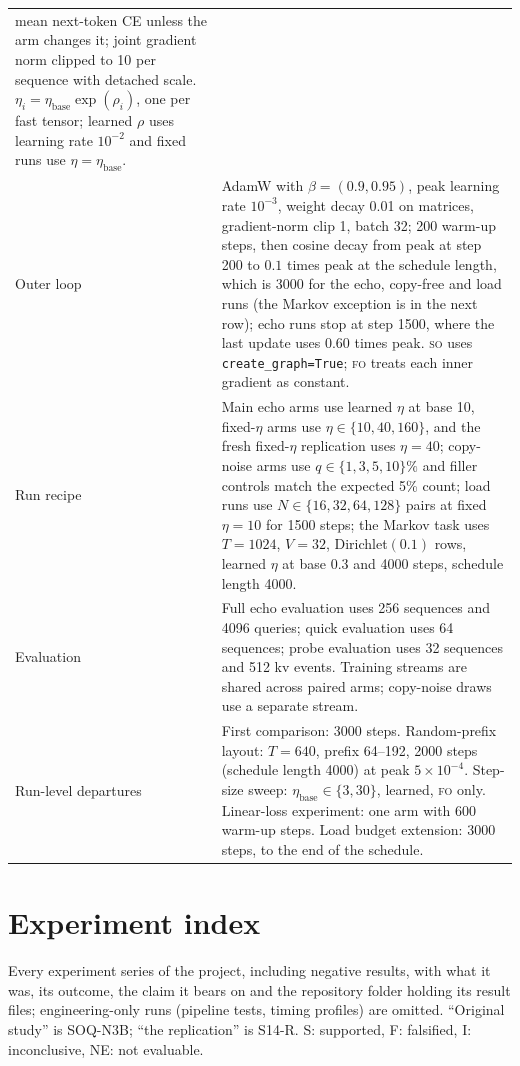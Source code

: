 \documentclass[11pt]{article}
\newcommand{\FO}{\textsc{fo}}
\newcommand{\SO}{\textsc{so}}
\begin{document}
\begin{table}[!htbp]
\begin{tabular}{@{}L{2.7cm}L{10.7cm}@{}}
mean next-token CE unless the arm changes it; joint gradient norm clipped to 10 per sequence with
detached scale. $\eta_i=\eta_{\text{base}}\exp(\rho_i)$, one per fast tensor; learned $\rho$ uses
learning rate $10^{-2}$ and fixed runs use $\eta=\eta_{\text{base}}$. \\
Outer loop & AdamW with $\beta=(0.9,0.95)$, peak learning rate $10^{-3}$, weight decay 0.01 on
matrices, gradient-norm clip 1, batch 32; 200 warm-up steps, then cosine decay from peak at step 200
to $0.1$ times peak at the schedule length, which is 3000 for the echo, copy-free and load runs (the
Markov exception is in the next row); echo runs stop at step 1500, where the last update uses $0.60$
times peak. \SO{} uses \texttt{create\_graph=True}; \FO{} treats each inner gradient as
constant. \\
Run recipe & Main echo arms use learned $\eta$ at base 10, fixed-$\eta$ arms use $\eta\in\{10,40,160\}$,
and the fresh fixed-$\eta$ replication uses $\eta=40$; copy-noise arms use $q\in\{1,3,5,10\}\%$ and
filler controls match the expected 5\% count; load runs use $N\in\{16,32,64,128\}$ pairs at fixed
$\eta=10$ for 1500 steps; the Markov task uses $T=1024$, $V=32$, Dirichlet$(0.1)$ rows, learned $\eta$
at base 0.3 and 4000 steps, schedule length 4000. \\
Evaluation & Full echo evaluation uses 256 sequences and 4096 queries; quick evaluation uses 64
sequences; probe evaluation uses 32 sequences and 512 kv events. Training streams are shared across
paired arms; copy-noise draws use a separate stream. \\
Run-level departures & First comparison: 3000 steps. Random-prefix layout: $T=640$, prefix 64--192,
2000 steps (schedule length 4000) at peak $5\times10^{-4}$. Step-size sweep: $\eta_{\text{base}}\in\{3,30\}$,
learned, \FO{} only. Linear-loss experiment: one arm with 600 warm-up steps. Load budget extension: 3000 steps, to the end of
the schedule. \\
\bottomrule
\end{tabular}
\end{table}

\FloatBarrier

\section{Experiment index}
\label{app:index}

Every experiment series of the project, including negative results, with what it was, its outcome,
the claim it bears on and the repository folder holding its result files; engineering-only runs
(pipeline tests, timing profiles) are omitted. ``Original study'' is SOQ-N3B; ``the replication'' is S14-R. S: supported, F: falsified, I: inconclusive, NE: not evaluable.
\end{document}
